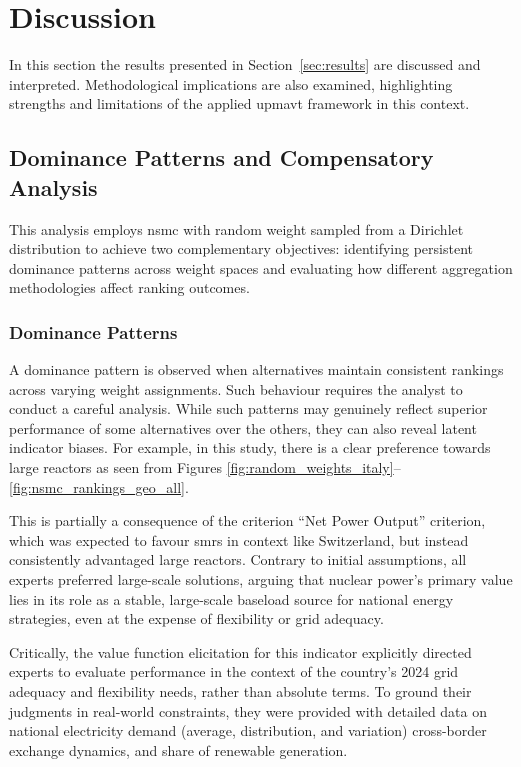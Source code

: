 \section{Discussion}
\label{sec:discussion}
In this section the results presented in Section~\ref{sec:results} are discussed and interpreted. Methodological implications are also examined, highlighting strengths and limitations of the applied \gls{upmavt} framework in this context.

\subsection{Dominance Patterns and Compensatory Analysis}
\label{sec:weight_analysis}

This analysis employs \gls{nsmc} with random weight sampled from a Dirichlet distribution to achieve two complementary objectives: identifying persistent dominance patterns across weight spaces and evaluating how different aggregation methodologies affect ranking outcomes.

\subsubsection{Dominance Patterns}
A dominance pattern is observed when alternatives maintain consistent rankings across varying weight assignments. Such behaviour requires the analyst to conduct a careful analysis. While such patterns may genuinely reflect superior performance of some alternatives over the others, they can also reveal latent indicator biases. For example, in this study, there is a clear preference towards large reactors as seen from Figures \ref{fig:random_weights_italy}--\ref{fig:nsmc_rankings_geo_all}.

This is partially a consequence of the criterion “Net Power Output” criterion, which was expected to favour \glspl{smr} in context like Switzerland, but instead consistently advantaged large reactors. Contrary to initial assumptions, all experts preferred large-scale solutions, arguing that nuclear power’s primary value lies in its role as a stable, large-scale baseload source for national energy strategies, even at the expense of flexibility or grid adequacy.

Critically, the value function elicitation for this indicator explicitly directed experts to evaluate performance in the context of the country’s 2024 grid adequacy and flexibility needs, rather than absolute terms. To ground their judgments in real-world constraints, they were provided with detailed data on national electricity demand (average, distribution, and variation) cross-border exchange dynamics, and share of renewable generation.

